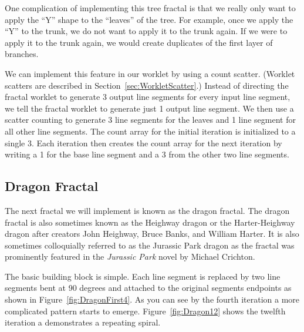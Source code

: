 One complication of implementing this tree fractal is that we really only want to apply the ``Y'' shape to the ``leaves'' of the tree.
For example, once we apply the ``Y'' to the trunk, we do not want to apply it to the trunk again.
If we were to apply it to the trunk again, we would create duplicates of the first layer of branches.

We can implement this feature in our worklet by using a count scatter.
(Worklet scatters are described in Section~\ref{sec:WorkletScatter}.)
Instead of directing the fractal worklet to generate 3 output line segments for every input line segment, we tell the fractal worklet to generate just 1 output line segment.
We then use a scatter counting to generate 3 line segments for the leaves and 1 line segment for all other line segments.
The count array for the initial iteration is initialized to a single 3.
Each iteration then creates the count array for the next iteration by writing a 1 for the base line segment and a 3 from the other two line segments.


\subsection{Dragon Fractal}


The next fractal we will implement is known as the dragon fractal.
The dragon fractal is also sometimes known as the Heighway dragon or the Harter-Heighway dragon after creators John Heighway, Bruce Banks, and William Harter.
It is also sometimes colloquially referred to as the Jurassic Park dragon as the fractal was prominently featured in the \textit{Jurassic Park} novel by Michael Crichton.

The basic building block is simple.
Each line segment is replaced by two line segments bent at 90 degrees and attached to the original segments endpoints as shown in Figure~\ref{fig:DragonFirst4}.
As you can see by the fourth iteration a more complicated pattern starts to emerge.
Figure~\ref{fig:Dragon12} shows the twelfth iteration a demonstrates a repeating spiral.

